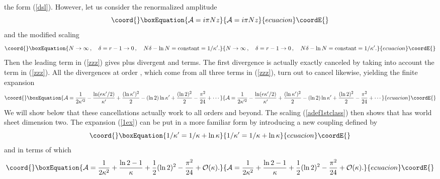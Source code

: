 \documentclass[a4paper,12pt]{article}
\begin{document}
{the form (\ref{dsl}). However, let us consider the renormalized amplitude
%
\begin{equation}\coord{}\boxEquation{
\label{adef1stclass}
{\cal A} = i\pi N z
}{
{\cal A} = i\pi N z
}{ecuacion}\coordE{}\end{equation}
%
and the modified scaling
%
\begin{equation}\coord{}\boxEquation{
\label{sca1stclass}
N\rightarrow\infty \, ,\quad \delta = r-1\rightarrow 0\, ,\quad
N\delta - \ln N = {\rm constant} = 1/\kappa' .
}{
N\rightarrow\infty \, ,\quad \delta = r-1\rightarrow 0\, ,\quad
N\delta - \ln N = {\rm constant} = 1/\kappa' .
}{ecuacion}\coordE{}\end{equation}
%
Then the leading term in (\ref{zzz}) gives \coordHE{} plus divergent
\coordHE{} and \coordHE{} terms. The first divergence is 
actually exactly canceled by taking into account the \coordHE{} term in 
(\ref{zzz}). All the divergences at order \coordHE{}, which come from 
all three terms in (\ref{zzz}), turn out to cancel likewise, yielding 
the finite expansion
%
\begin{equation}\coord{}\boxEquation{
\label{1ex}
{\cal A} = {1\over 2\kappa'^{2}} - {\ln(e\kappa' /2)\over\kappa'} + 
{(\ln\kappa')^{2}\over 2} - (\ln 2)\ln\kappa' + {(\ln 2)^{2}\over 2} - 
{\pi^{2}\over 24} + \cdots
}{
{\cal A} = {1\over 2\kappa'^{2}} - {\ln(e\kappa' /2)\over\kappa'} + 
{(\ln\kappa')^{2}\over 2} - (\ln 2)\ln\kappa' + {(\ln 2)^{2}\over 2} - 
{\pi^{2}\over 24} + \cdots
}{ecuacion}\coordE{}\end{equation}
%
We will show below that these cancellations actually work to all orders 
and beyond. The scaling (\ref{adef1stclass}) 
then shows that \coordHE{} has world sheet dimension two.  
The expansion (\ref{1ex}) can be put in a more familiar form by 
introducing a new coupling \myHighlight{$\kappa$}\coordHE{} defined by
%
\begin{equation}\coord{}\boxEquation{
\label{kapdef1}
1/\kappa' =1/\kappa + \ln\kappa
}{
1/\kappa' =1/\kappa + \ln\kappa
}{ecuacion}\coordE{}\end{equation}
%
and in terms of which
%
\begin{equation}\coord{}\boxEquation{
\label{goodexp}
{\cal A} = {1\over 2\kappa^{2}} + {\ln 2 -1\over\kappa} + {1\over 2}(\ln 
2)^{2} - {\pi^{2}\over 24} + {\cal O}(\kappa).
}{
{\cal A} = {1\over 2\kappa^{2}} + {\ln 2 -1\over\kappa} + {1\over 2}(\ln 
2)^{2} - {\pi^{2}\over 24} + {\cal O}(\kappa).
}{ecuacion}\coordE{}\end{equation}
%
}
\end{document}

